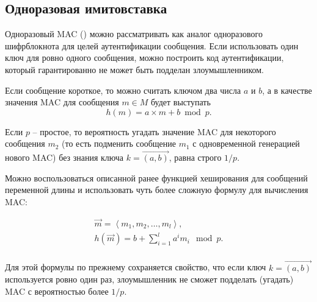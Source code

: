 \subsection{Одноразовая имитовставка}\label{sec:one-time-mac}
Одноразовый MAC () можно рассматривать как аналог одноразового шифрблокнота для целей аутентификации сообщения. Если использовать один ключ для ровно одного сообщения, можно построить код аутентификации, который гарантированно не может быть подделан злоумышленником.

Если сообщение короткое, то можно считать ключом два числа $a$ и $b$, а в качестве значения MAC для сообщения $m \in M$ будет выступать
\[
h(m) = a \times m + b \bmod p.
\]

Если $p$ -- простое, то вероятность угадать значение MAC для некоторого сообщения $m_2$ (то есть подменить сообщение $m_1$ с одновременной генерацией нового MAC) без знания ключа $k=\overrightarrow{(a,b)}$, равна строго $1/p$.

Можно воспользоваться описанной ранее функцией хеширования для сообщений переменной длины и использовать чуть более сложную формулу для вычисления MAC:

\[ \begin{array}{l}
\vec{m} = \left \langle m_1, m_2, \dots, m_l \right \rangle, \\
h(\vec{m}) = b + \sum_{i=1}^{l} a^i m_i \mod p. \\
\end{array}  \]

Для этой формулы по прежнему сохраняется свойство, что если ключ $k=\overrightarrow{(a,b)}$ используется ровно один раз, злоумышленник не сможет подделать (угадать) MAC с вероятностью более $1/p$.
